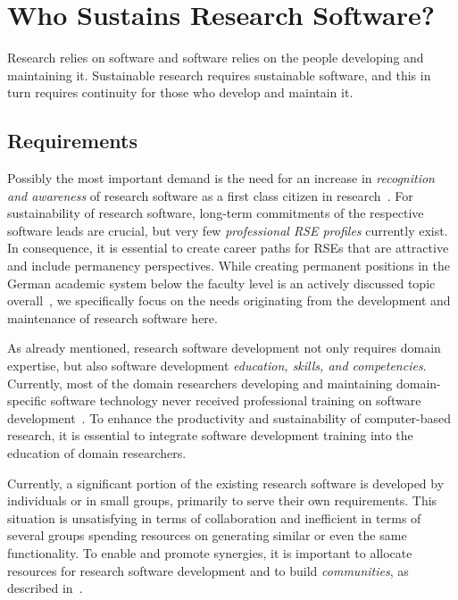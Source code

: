 \documentclass[a4paper,num-refs,numbers,sort&compress]{de-rse}
\begin{document}
\section{Who Sustains Research Software?}
\label{sec:who_sustains}

Research relies on software and software relies on the people developing and maintaining it.
Sustainable research requires sustainable software, and this in turn requires continuity for those who develop and maintain it.

\subsection{Requirements}
Possibly the most important demand is the need for an increase in \textit{recognition and awareness} of research software as a first class citizen in research~\cite{Akhmerov2019,ChueHong2019,https://doi.org/10.2312/os.helmholtz.003}.
For sustainability of research software, long-term commitments of the respective software leads are crucial, but very few \textit{professional RSE profiles} currently exist.
In consequence, it is essential to create career paths for RSEs that are attractive and include permanency perspectives.
While creating permanent positions in the German academic system below the faculty level is an actively discussed topic overall~\cite{BayreutherErklaerung}, we specifically focus on the needs originating from the development and maintenance of research software here.

As already mentioned, research software development not only requires domain expertise, but also software development \textit{education, skills, and competencies}.
Currently, most of the domain researchers developing and maintaining domain-specific software technology never received professional training on software development~\cite{Wilson2014,SSIanalysis}.
To enhance the productivity and sustainability of computer-based research, it is essential to integrate software development training into the education of domain researchers.

Currently, a significant portion of the existing research software is developed by individuals or in small groups, primarily to serve their own requirements.
This situation is unsatisfying in terms of collaboration and inefficient in terms of several groups spending resources on generating similar or even the same functionality.
To enable and promote synergies, it is important to allocate resources for research software development and to build \textit{communities}, as described in~\cite{Katz19community}.
\end{document}
